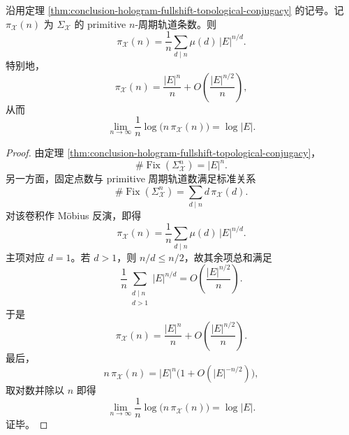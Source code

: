 \begin{corollary}\label{cor:conclusion-hologram-fullshift-primitive-orbit-prime-law}
沿用定理 \ref{thm:conclusion-hologram-fullshift-topological-conjugacy} 的记号。记 \(\pi_{\mathcal X}(n)\) 为 \(\Sigma_{\mathcal X}\) 的 primitive \(n\)-周期轨道条数。则
\[
\boxed{\;
\pi_{\mathcal X}(n)
=
\frac1n\sum_{d\mid n}\mu(d)\,|E|^{n/d}.\;}
\]
特别地，
\[
\boxed{\;
\pi_{\mathcal X}(n)
=
\frac{|E|^n}{n}
+O\!\left(\frac{|E|^{n/2}}{n}\right),\;}
\]
从而
\[
\boxed{\;
\lim_{n\to\infty}\frac1n\log\bigl(n\,\pi_{\mathcal X}(n)\bigr)=\log|E|.\;}
\]
\end{corollary}
\begin{proof}
由定理 \ref{thm:conclusion-hologram-fullshift-topological-conjugacy}，
\[
\#\operatorname{Fix}(\Sigma_{\mathcal X}^n)=|E|^n.
\]
另一方面，固定点数与 primitive 周期轨道数满足标准关系
\[
\#\operatorname{Fix}(\Sigma_{\mathcal X}^n)
=
\sum_{d\mid n} d\,\pi_{\mathcal X}(d).
\]
对该卷积作 Möbius 反演，即得
\[
\pi_{\mathcal X}(n)=\frac1n\sum_{d\mid n}\mu(d)\,|E|^{n/d}.
\]
主项对应 \(d=1\)。若 \(d>1\)，则 \(n/d\le n/2\)，故其余项总和满足
\[
\frac1n\sum_{\substack{d\mid n\\ d>1}}|E|^{n/d}
=
O\!\left(\frac{|E|^{n/2}}{n}\right).
\]
于是
\[
\pi_{\mathcal X}(n)
=
\frac{|E|^n}{n}
+O\!\left(\frac{|E|^{n/2}}{n}\right).
\]
最后，
\[
n\,\pi_{\mathcal X}(n)=|E|^n\bigl(1+O(|E|^{-n/2})\bigr),
\]
取对数并除以 \(n\) 即得
\[
\lim_{n\to\infty}\frac1n\log\bigl(n\,\pi_{\mathcal X}(n)\bigr)=\log|E|.
\]
证毕。
\end{proof}

